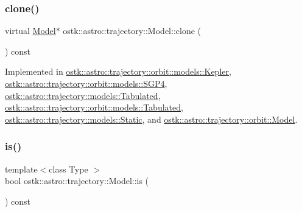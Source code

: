 \subsubsection{\texorpdfstring{clone()}{clone()}}
{\footnotesize\ttfamily virtual \hyperlink{classostk_1_1astro_1_1trajectory_1_1_model}{Model}$\ast$ ostk\+::astro\+::trajectory\+::\+Model\+::clone (\begin{DoxyParamCaption}{ }\end{DoxyParamCaption}) const\hspace{0.3cm}{\ttfamily [pure virtual]}}



Implemented in \hyperlink{classostk_1_1astro_1_1trajectory_1_1orbit_1_1models_1_1_kepler_afb76b3571c73fb5c87129033f7d66520}{ostk\+::astro\+::trajectory\+::orbit\+::models\+::\+Kepler}, \hyperlink{classostk_1_1astro_1_1trajectory_1_1orbit_1_1models_1_1_s_g_p4_afb9928e09d66c13a77eb1126da6139eb}{ostk\+::astro\+::trajectory\+::orbit\+::models\+::\+S\+G\+P4}, \hyperlink{classostk_1_1astro_1_1trajectory_1_1models_1_1_tabulated_a553d2c4027ce269c1c2b3f4e9c65e14d}{ostk\+::astro\+::trajectory\+::models\+::\+Tabulated}, \hyperlink{classostk_1_1astro_1_1trajectory_1_1orbit_1_1models_1_1_tabulated_a53603727c33f9ff8db520831cf666142}{ostk\+::astro\+::trajectory\+::orbit\+::models\+::\+Tabulated}, \hyperlink{classostk_1_1astro_1_1trajectory_1_1models_1_1_static_abe3edbc72ae2f4fbd6c2593e2aa08755}{ostk\+::astro\+::trajectory\+::models\+::\+Static}, and \hyperlink{classostk_1_1astro_1_1trajectory_1_1orbit_1_1_model_a53dc07564e4c7c444da46360aa8ada15}{ostk\+::astro\+::trajectory\+::orbit\+::\+Model}.

\mbox{\label{classostk_1_1astro_1_1trajectory_1_1_model_aedde1c01efbf407cca64b3f18b1a60f2}} 
\subsubsection{\texorpdfstring{is()}{is()}}
{\footnotesize\ttfamily template$<$class Type $>$ \\
bool ostk\+::astro\+::trajectory\+::\+Model\+::is (\begin{DoxyParamCaption}{ }\end{DoxyParamCaption}) const\hspace{0.3cm}{\ttfamily [inline]}}



